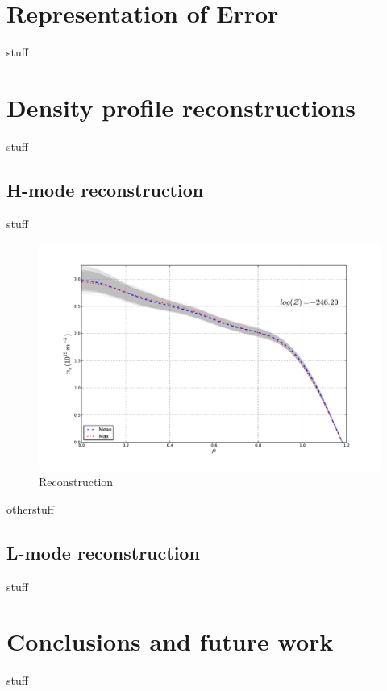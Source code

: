 \documentclass	[12pt]{article}
\begin{document}
\section{Representation of Error}
stuff
\section{Density profile reconstructions}
stuff
\subsection{H-mode reconstruction}
stuff
\begin{figure}[h]
\includegraphics[scale=.5,keepaspectratio=true]{figures/bfit146102_00505_all5}
\caption{Reconstruction}
\label{hi}
\end{figure}

otherstuff
\subsection{L-mode reconstruction}
stuff
\section{Conclusions and future work}
stuff



\end{document}
